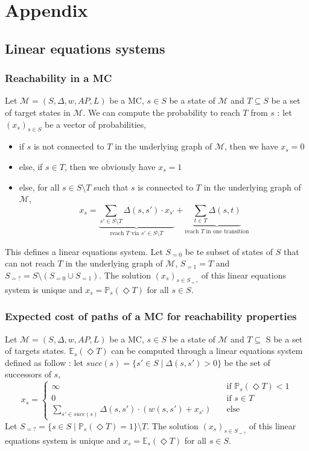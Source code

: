 \chapter*{Appendix}

\section{Linear equations systems}
\subsection{Reachability in a MC}
Let $\mathcal{M} = (S, \Delta, w, AP, L)$ be a MC, $s \in S$ be a state of $\mathcal{M}$ and $T \subseteq S$ be a set of target states in $\mathcal{M}$.
We can compute the probability to reach $T$ from $s$ :
let $(x_s)_{s \in S}$ be a vector of probabilities,
\begin{itemize}
	\item if $s$ is not connected to $T$ in the underlying graph of $\mathcal{M}$, then we have $x_s = 0$
	\item else, if $s \in T$, then we obviously have $x_s = 1$
	\item else, for all $s \in S \setminus T$  such that $s$ is connected to $T$ in the underlying graph of $\mathcal{M}$,
		\[
      x_s = \underbrace{\sum_{s' \in S \setminus T} \Delta(s, s') \cdot x_{s'}}_{\text{reach $T$ via $s' \in S \setminus T$}} + \underbrace{\sum_{t \in T} \Delta(s, t)}_{\text{reach $T$ in one transition}}
    \]
\end{itemize}
This defines a linear equations system.
Let $S_{=0}$ be te subset of states of $S$ that can not reach $T$ in the underlying graph of $\mathcal{M}$, $S_{=1} = T$ and $S_{=?} = S \setminus (S_{=0} \cup S_{=1})$.
The solution $(x_s)_{s \in S_{=?}}$ of this linear equations system is unique and $x_s = \mathbb{P}_s(\Diamond T)$ for all $s \in S$.

\subsection{Expected cost of paths of a MC for reachability properties}
  Let $\mathcal{M} = (S, \Delta, w, AP, L)$ be a MC, $s \in S$ be a state of $\mathcal{M}$ and $T \subseteq$ S be a set of targets states. $\mathbb{E}_s(\Diamond T)$ can be computed through a linear equations system defined as follow :
  let $succ(s) = \{ s' \in S \; | \; \Delta(s, s') > 0 \}$ be the set of successors of $s$,
  \[ x_s =
  	\begin{cases}
  	\infty & \quad \text{if } \mathbb{P}_s(\Diamond T) < 1 \\
  	0 & \quad \text{if } s \in T \\
  	\sum_{s' \in succ(s)} \Delta(s, s') \cdot (w(s, s') + x_{s'}) & \quad \text{else}
  	\end{cases}
  \]
Let $S_{=?} = \{ s \in S \; | \; \mathbb{P}_s(\Diamond T) = 1 \} \setminus T$. The solution $(x_s)_{s \in S_{=?}}$ of this linear equations system is unique and $x_s = \mathbb{E}_s(\Diamond T)$ for all $s \in S$.

